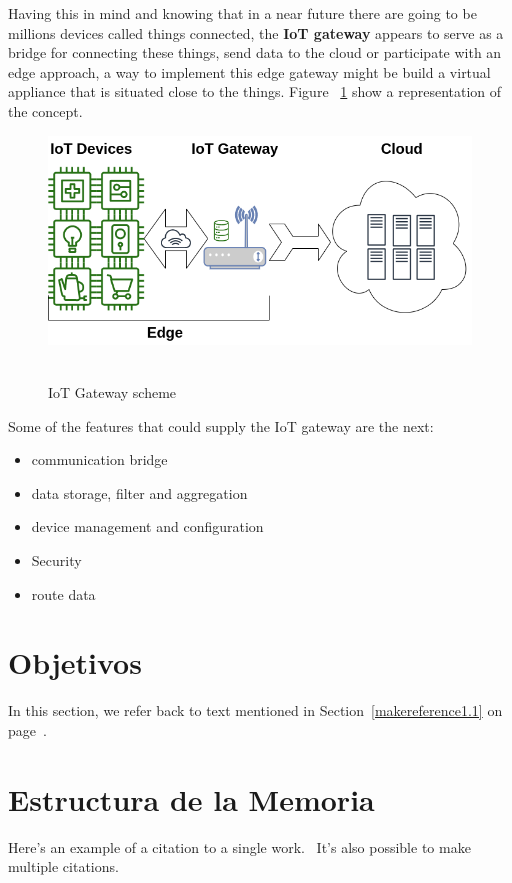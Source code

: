 Having this in mind and knowing that in a near future there are going to be millions devices called things connected, the \textbf{IoT gateway} appears to serve as a bridge for connecting these things, send data to the cloud or participate with an edge approach, a way to implement this edge gateway might be build a virtual appliance that is situated close to the things. Figure ~\ref{figure1.1} show a representation of the concept.


\begin{figure}[h]%
    \includegraphics[width=6.5in]{figures/iot_gateway.png}
~\caption{IoT Gateway scheme}
\label{figure1.1}
\end{figure}

Some of the features that could supply the IoT gateway are the next:

\begin{itemize}
  \item communication bridge
  \item data storage, filter and aggregation
  \item device management and configuration
  \item Security 
  \item route data
\end{itemize}

\section{Objetivos}
\label{makereference1.2}

In this section, we refer back to text mentioned in
Section~\ref{makereference1.1} on page~\pageref{makereference1.1}.

\section{Estructura de la Memoria}
\label{makereference1.3}

Here's an example of a citation to a single
work.~\citet{CT:Weiner:1999} It's also possible to make multiple
citations.~\citet{CT:Phillips:1985, ARP:Loy:1974}
